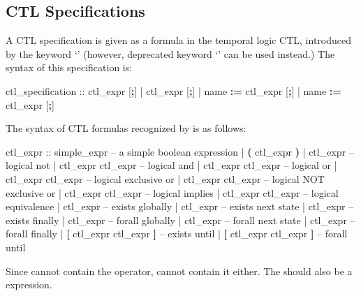 \subsection{CTL Specifications}
\label{CTL Specifications}
%
A CTL specification is given as a formula in the temporal logic CTL,
introduced by the keyword `' (however, deprecated
keyword `' can be used instead.)
%
The syntax of this specification is:
%
\begin{Grammar}
ctl_specification ::  ctl_expr [\textbf{;}]
                   |  ctl_expr [\textbf{;}]
                   |   name \textbf{:=} ctl_expr [\textbf{;}]
                   |   name \textbf{:=} ctl_expr [\textbf{;}]

\end{Grammar}
%
The syntax of CTL formulas recognized by \nusmv is as follows:
%
\begin{Grammar}
ctl_expr ::
    simple_expr                 -- a simple boolean expression
    | \textbf{(} ctl_expr \textbf{)}
    | \operator{!} ctl_expr                -- logical not
    | ctl_expr \operator{\&} ctl_expr       -- logical and
    | ctl_expr \operator{|} ctl_expr       -- logical or
    | ctl_expr  ctl_expr     -- logical exclusive or
    | ctl_expr  ctl_expr    -- logical NOT exclusive or
    | ctl_expr \operator{->} ctl_expr      -- logical implies
    | ctl_expr \operator{<->} ctl_expr     -- logical equivalence
    |  ctl_expr               -- exists globally
    |  ctl_expr               -- exists next state
    |  ctl_expr               -- exists finally
    |  ctl_expr               -- forall globally
    |  ctl_expr               -- forall next state
    |  ctl_expr               -- forall finally
    |  \textbf{[} ctl_expr  ctl_expr \textbf{]} -- exists until
    |  \textbf{[} ctl_expr  ctl_expr \textbf{]} -- forall until
\end{Grammar}
%
Since  cannot contain the 
operator,  cannot contain it either.
%
The  should also be a \Boolean expression.


